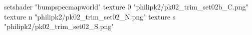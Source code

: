 setshader "bumpspecmapworld"
    texture 0 "philipk2/pk02_trim_set02b_C.png"
    texture n "philipk2/pk02_trim_set02_N.png"
    texture s "philipk2/pk02_trim_set02_S.png"